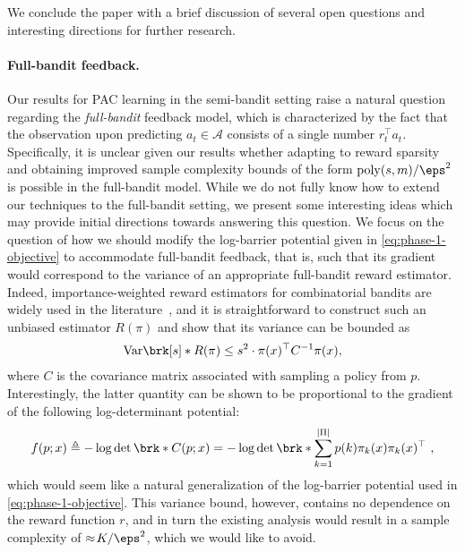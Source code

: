 \documentclass[11pt]{article}
\newcommand{\eqdef}{\triangleq}
\newcommand{\poly}{\operatorname{poly}}
\newcommand{\pred}{a}
\newcommand{\rew}{r}
\newcommand{\calA}{\mathcal{A}}
\newcommand{\objrand}{f}
\theoremstyle{plain}
\begin{document}
We conclude the paper with a brief discussion of several open questions and interesting directions for further research.

\paragraph{Full-bandit feedback.} Our results for PAC learning in the semi-bandit setting raise a natural question regarding the \emph{full-bandit} feedback model, which is characterized by the fact that the observation upon predicting $\pred_t \in \calA$ consists of a single number $\rew_t^\top \pred_t$. Specifically, it is unclear given our results whether adapting to reward sparsity and obtaining improved sample complexity bounds of the form $\poly(s,m) / \eps^2$ is possible in the full-bandit model.
While we do not fully know how to extend our techniques to the full-bandit setting, we present some interesting ideas which may provide initial directions towards answering this question. We focus on the question of how we should modify the log-barrier potential given in \cref{eq:phase-1-objective} to accommodate full-bandit feedback, that is, such that its gradient would correspond to the variance of an appropriate full-bandit reward estimator. Indeed, importance-weighted reward estimators for combinatorial bandits are widely used in the literature~\citep[see, e.g.,][]{audibert2014regret}, and it is straightforward to construct such an unbiased estimator $R(\pi)$ and show that its variance can be bounded as
\begin{align*}
    \mathrm{Var} \brk[s]*{R(\pi)}
    \leq s^2 \cdot \pi(x)^\top C^{-1} \pi(x),
\end{align*}
where $C$ is the covariance matrix associated with sampling a policy from $p$.
Interestingly, the latter quantity can be shown to be proportional to the gradient of the following log-determinant potential:
\begin{align*}
    \objrand(p;x) \eqdef - \log \det \brk*{C(p; x)} = - \log \det \brk*{\sum_{k=1}^{|\Pi|} p(k) \pi_k(x) \pi_k(x)^\top}
    ~,
\end{align*}
which would seem like a natural generalization of the log-barrier potential used in \cref{eq:phase-1-objective}. This variance bound, however, contains no dependence on the reward function $r$, and in turn the existing analysis would result in a sample complexity of $\approx\! K / \eps^2$, which we would like to avoid. 
\end{document}
